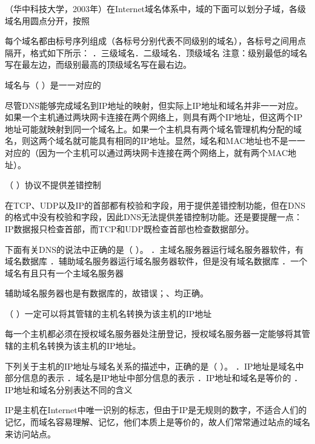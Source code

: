 \question （华中科技大学，2003年）在Internet域名体系中，域的下面可以划分子域，各级域名用圆点分开，按照
\par{}
\begin{solution}每个域名都由标号序列组成（各标号分别代表不同级别的域名），各标号之间用点隔开，格式如下所示：
．三级域名．二级域名．顶级域名
注意：级别最低的域名写在最左边，而级别最高的顶级域名写在最右边。
\end{solution}
\question 域名与（ ）是一一对应的
\par{}
\begin{solution}尽管DNS能够完成域名到IP地址的映射，但实际上IP地址和域名并非一一对应。如果一个主机通过两块网卡连接在两个网络上，则具有两个IP地址，但这两个IP地址可能就映射到同一个域名上。如果一个主机具有两个域名管理机构分配的域名，则这两个域名就可能具有相同的IP地址。显然，域名和MAC地址也不是一一对应的（因为一个主机可以通过两块网卡连接在两个网络上，就有两个MAC地址）。
\end{solution}
\question （ ）协议不提供差错控制
\par{}
\begin{solution}在TCP、UDP以及IP的首部都有校验和字段，用于提供差错控制功能，但在DNS的格式中没有校验和字段，因此DNS无法提供差错控制功能。还是要提醒一点：IP数据报只检查首部，而TCP和UDP既检查首部也检查数据部分。
\end{solution}
\question 下面有关DNS的说法中正确的是（ ）。
．主域名服务器运行域名服务器软件，有域名数据库
．辅助域名服务器运行域名服务器软件，但是没有域名数据库
．一个域名有且只有一个主域名服务器
\par{}
\begin{solution}辅助域名服务器也是有数据库的，故错误；、均正确。
\end{solution}
\question （ ）一定可以将其管辖的主机名转换为该主机的IP地址
\par{}
\begin{solution}每一个主机都必须在授权域名服务器处注册登记，授权域名服务器一定能够将其管辖的主机名转换为该主机的IP地址。
\end{solution}
\question 下列关于主机的IP地址与域名关系的描述中，正确的是（ ）。
．IP地址是域名中部分信息的表示 ．域名是IP地址中部分信息的表示
．IP地址和域名是等价的 ．IP地址和域名分别表达不同的含义
\par{}
\begin{solution}IP是主机在Internet中唯一识别的标志，但由于IP是无规则的数字，不适合人们的记忆，而域名容易理解、记忆，他们本质上是等价的，故人们常常通过站点的域名来访问站点。
\end{solution}
